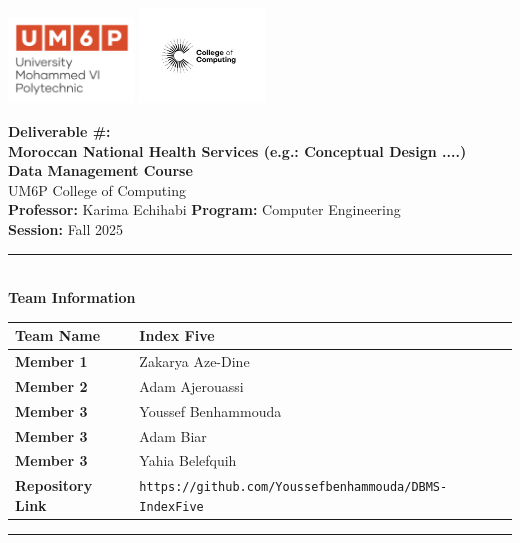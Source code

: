 \documentclass[a4paper,12pt]{article}
\begin{document}
\thispagestyle{empty}
\begin{center}
  \includegraphics[width=0.25\textwidth]{Figures/UM6Plogo.png}\hfill
  \includegraphics[width=0.25\textwidth]{Figures/CC.jpg}
  \vspace{1.2cm}

  {\LARGE \textbf{Deliverable \#: \\[0.5cm] Moroccan National Health Services (e.g.: Conceptual Design ....)}}\\[0.6cm]
  {\large \textbf{Data Management Course}}\\[0.2cm]
  {\large UM6P College of Computing}\\[0.8cm]

  {\normalsize \textbf{Professor:} Karima Echihabi \quad 
   \textbf{Program:} Computer Engineering}\\[0.1cm]
  {\normalsize \textbf{Session:} Fall 2025}\\[1cm]

  \rule{0.9\textwidth}{0.5pt}\\[0.5cm]
  {\large \textbf{Team Information}} \\[0.3cm]
  \begin{tabular}{|l|l|}
    \hline
    \textbf{Team Name} & Index Five \\ \hline
    \textbf{Member 1}  & Zakarya Aze-Dine  \\ \hline
    \textbf{Member 2}  & Adam Ajerouassi   \\ \hline
    \textbf{Member 3}  & Youssef Benhammouda   \\ \hline
    \textbf{Member 3}  & Adam Biar   \\ \hline
    \textbf{Member 3}  & Yahia Belefquih   \\ \hline


    \textbf{Repository Link} & \texttt{https://github.com/Youssefbenhammouda/DBMS-IndexFive} \\ \hline
  \end{tabular}
  \rule{0.9\textwidth}{0.5pt}\\
\end{center}
\clearpage
\pagestyle{fancy}
\end{document}
